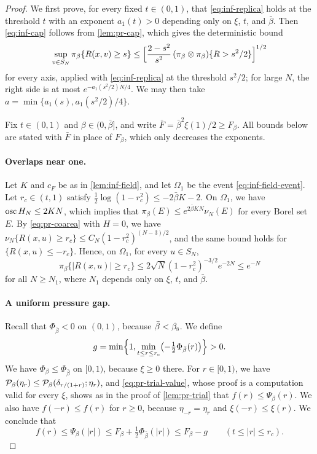 \begin{proof}
We first prove, for every fixed $t\in(0,1)$, that \eqref{eq:inf-replica} holds at the threshold $t$ with an exponent $a_1(t)>0$ depending only on $\xi$, $t$, and $\bar\beta$. Then \eqref{eq:inf-cap} follows from \cref{lem:pr-cap}, which gives the deterministic bound
\begin{equation*}
\sup_{v\in S_N}\pi_\beta\{R(x,v)\ge s\}\le\Bigl[\frac{2-s^2}{s^2}\,(\pi_\beta\otimes\pi_\beta)\{R>s^2/2\}\Bigr]^{1/2}
\end{equation*}
for every axis, applied with \eqref{eq:inf-replica} at the threshold $s^2/2$; for large $N$, the right side is at most $e^{-a_1(s^2/2)N/4}$. We may then take $a=\min\{a_1(s),a_1(s^2/2)/4\}$.

Fix $t\in(0,1)$ and $\beta\in(0,\bar\beta]$, and write $\bar F=\bar\beta^2\xi(1)/2\ge F_\beta$. All bounds below are stated with $\bar F$ in place of $F_\beta$, which only decreases the exponents.

\paragraph{Overlaps near one.} Let $K$ and $c_F$ be as in \cref{lem:inf-field}, and let $\Omega_1$ be the event \eqref{eq:inf-field-event}. Let $r_c\in(t,1)$ satisfy $\frac12\log(1-r_c^2)\le-2\bar\beta K-2$. On $\Omega_1$, we have $\operatorname{osc} H_N\le2KN$, which implies that $\pi_\beta(E)\le e^{2\bar\beta KN}\nu_N(E)$ for every Borel set $E$. By \eqref{eq:pr-coarea} with $H=0$, we have $\nu_N\{R(x,u)\ge r_c\}\le C_N(1-r_c^2)^{(N-3)/2}$, and the same bound holds for $\{R(x,u)\le-r_c\}$. Hence, on $\Omega_1$, for every $u\in S_N$,
\begin{equation}\label{eq:inf-near-one}
\pi_\beta\{|R(x,u)|\ge r_c\}\le2\sqrt N(1-r_c^2)^{-3/2}e^{-2N}\le e^{-N}
\end{equation}
for all $N\ge N_1$, where $N_1$ depends only on $\xi$, $t$, and $\bar\beta$.

\paragraph{A uniform pressure gap.} Recall that $\Phi_{\bar\beta}<0$ on $(0,1)$, because $\bar\beta<\beta_{\mathrm s}$. We define
\begin{equation*}
g=\min\Bigl\{1,\min_{t\le r\le r_c}\bigl(-\tfrac12\Phi_{\bar\beta}(r)\bigr)\Bigr\}>0.
\end{equation*}
We have $\Phi_\beta\le\Phi_{\bar\beta}$ on $[0,1)$, because $\xi\ge0$ there. For $r\in[0,1)$, we have $\mathcal P_\beta(\eta_r)\le\mathcal P_\beta(\delta_{r/(1+r)};\eta_r)$, and \eqref{eq:pr-trial-value}, whose proof is a computation valid for every $\xi$, shows as in the proof of \cref{lem:pr-trial} that $f(r)\le\Psi_\beta(r)$. We also have $f(-r)\le f(r)$ for $r\ge0$, because $\eta_{-r}=\eta_r$ and $\xi(-r)\le\xi(r)$. We conclude that
\begin{equation}\label{eq:inf-gap}
f(r)\le\Psi_\beta(|r|)\le F_\beta+\tfrac12\Phi_{\bar\beta}(|r|)\le F_\beta-g\qquad(t\le|r|\le r_c).
\end{equation}


\end{proof}
